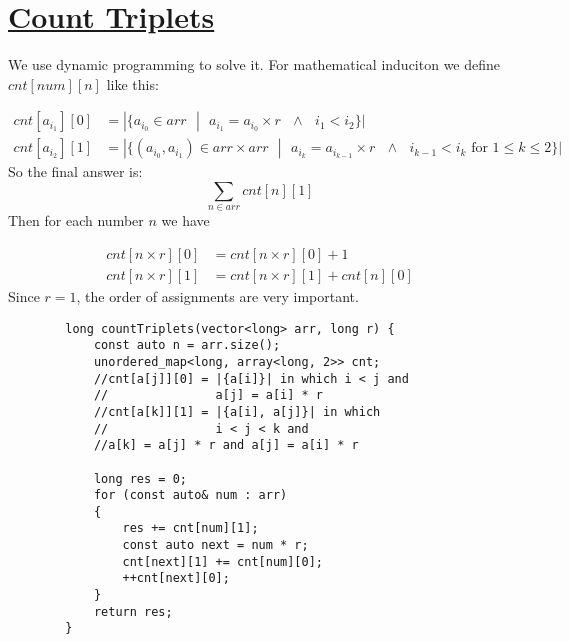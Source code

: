 \documentclass{book}
\begin{document}
 	\section{\href{https://www.hackerrank.com/challenges/count-triplets-1/problem}{Count Triplets}}	
 	We use dynamic programming to solve it. For mathematical induciton we define $cnt[num][n]$ like this:
 	
 	\begin{equation*}
 		\begin{split}
 		cnt[a_{i_1}][0] &= |\{a_{i_0} \in arr \text{ }| \text{ } a_{i_1} = a_{i_0} \times r \text{ }\land \text{ } i_1 < i_2\}| \\
 		cnt[a_{i_2}][1] &= |\{(a_{i_0}, a_{i_1}) \in arr \times arr \text{ }| \text{ } a_{i_k} = a_{i_{k - 1}} \times r \text{ }\land \text{ } i_{k - 1} < i_k  \text{ for }1 \le k \le 2\}|
 		\end{split}
 	\end{equation*}
 	So the final answer is:
 	\begin{equation*}
 	\sum_{n \in arr}{cnt[n][1]}
 	\end{equation*}
 	Then for each number $n$ we have
 	
 	\begin{equation*}
 	\begin{split}
 	cnt[n \times r][0] &= cnt[n \times r][0] + 1 \\
 	cnt[n \times r][1] &= cnt[n \times r][1] + cnt[n][0]
 	\end{split}
 	\end{equation*}
 	Since $r = 1$, the order of assignments are very important.
 	
 	\begin{lstlisting}
        long countTriplets(vector<long> arr, long r) {
            const auto n = arr.size();
            unordered_map<long, array<long, 2>> cnt;
            //cnt[a[j]][0] = |{a[i]}| in which i < j and 
            //               a[j] = a[i] * r
            //cnt[a[k]][1] = |{a[i], a[j]}| in which 
            //               i < j < k and 
            //a[k] = a[j] * r and a[j] = a[i] * r
            
            long res = 0;
            for (const auto& num : arr)
            {
                res += cnt[num][1];
                const auto next = num * r;
                cnt[next][1] += cnt[num][0];
                ++cnt[next][0];                       
            }
            return res;
        }
 	
 	\end{lstlisting}
\end{document}
